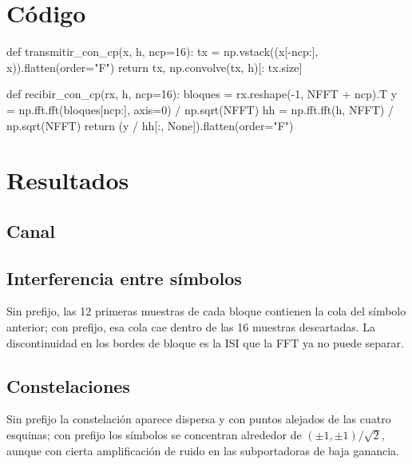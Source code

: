 \documentclass[11pt,a4paper]{article}
\begin{document}
\section{Código}

\begin{codigo}
def transmitir_con_cp(x, h, ncp=16):
    tx = np.vstack((x[-ncp:], x)).flatten(order="F")
    return tx, np.convolve(tx, h)[: tx.size]

def recibir_con_cp(rx, h, ncp=16):
    bloques = rx.reshape(-1, NFFT + ncp).T
    y = np.fft.fft(bloques[ncp:], axis=0) / np.sqrt(NFFT)
    hh = np.fft.fft(h, NFFT) / np.sqrt(NFFT)
    return (y / hh[:, None]).flatten(order="F")
\end{codigo}

\section{Resultados}

\subsection{Canal}


\subsection{Interferencia entre símbolos}


Sin prefijo, las 12 primeras muestras de cada bloque contienen la cola del símbolo
anterior; con prefijo, esa cola cae dentro de las 16 muestras descartadas. La discontinuidad
en los bordes de bloque es la ISI que la FFT ya no puede separar.

\subsection{Constelaciones}


Sin prefijo la constelación aparece dispersa y con puntos alejados de las cuatro esquinas;
con prefijo los símbolos se concentran alrededor de $(\pm1,\pm1)/\sqrt{2}$, aunque con
cierta amplificación de ruido en las subportadoras de baja ganancia.
\end{document}
